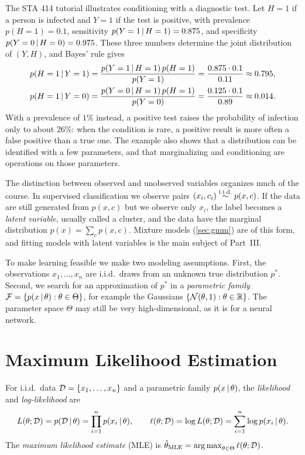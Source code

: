 \begin{remark}\label{rem:covid}
The STA 414 tutorial illustrates conditioning with a diagnostic test. Let $H=1$ if a person is infected and $Y=1$ if the test is positive, with prevalence $p(H=1)=0.1$, sensitivity $p(Y=1\,|\, H=1)=0.875$, and specificity $p(Y=0\,|\, H=0)=0.975$. These three numbers determine the joint distribution of $(Y,H)$, and Bayes' rule gives
\begin{gather*}
p(H=1\,|\, Y=1)=\frac{p(Y=1\,|\, H=1)\,p(H=1)}{p(Y=1)}=\frac{0.875\cdot0.1}{0.11}\approx0.795,\\
p(H=1\,|\, Y=0)=\frac{p(Y=0\,|\, H=1)\,p(H=1)}{p(Y=0)}=\frac{0.125\cdot0.1}{0.89}\approx0.014.
\end{gather*}
With a prevalence of $1\%$ instead, a positive test raises the probability of infection only to about $26\%$: when the condition is rare, a positive result is more often a false positive than a true one. The example also shows that a distribution can be identified with a few parameters, and that marginalizing and conditioning are operations on those parameters.
\end{remark}

The distinction between observed and unobserved variables organizes much of the course. In supervised classification we observe pairs $(x_i,c_i)\stackrel{\mathrm{i.i.d.}}{\sim} p(x,c)$. If the data are still generated from $p(x,c)$ but we observe only $x_i$, the label becomes a \emph{latent variable}, usually called a cluster, and the data have the marginal distribution $p(x)=\sum_cp(x,c)$. Mixture models (\cref{sec:gmm}) are of this form, and fitting models with latent variables is the main subject of Part~III.

To make learning feasible we make two modeling assumptions. First, the observations $x_1,\dots,x_n$ are i.i.d.\ draws from an unknown true distribution $p^*$. Second, we search for an approximation of $p^*$ in a \emph{parametric family} $\mathcal{F}=\{p(x\,|\,\theta):\theta\in\Theta\}$, for example the Gaussians $\{\mathcal{N}(\theta,1):\theta\in\mathbb{R}\}$. The parameter space $\Theta$ may still be very high-dimensional, as it is for a neural network.

\section{Maximum Likelihood Estimation}\label{sec:mle}

\begin{definition}\label{def:mle}
For i.i.d.\ data $\mathcal{D}=\{x_1,\dots,x_n\}$ and a parametric family $p(x\,|\,\theta)$, the \emph{likelihood} and \emph{log-likelihood} are
\[
L(\theta;\mathcal{D})=p(\mathcal{D}\,|\,\theta)=\prod_{i=1}^np(x_i\,|\,\theta),\qquad \ell(\theta;\mathcal{D})=\log L(\theta;\mathcal{D})=\sum_{i=1}^n\log p(x_i\,|\,\theta).
\]
The \emph{maximum likelihood estimate} (MLE) is $\hat\theta_{\mathrm{MLE}}=\operatorname*{arg\,max}_{\theta\in\Theta}\ell(\theta;\mathcal{D})$.
\end{definition}

